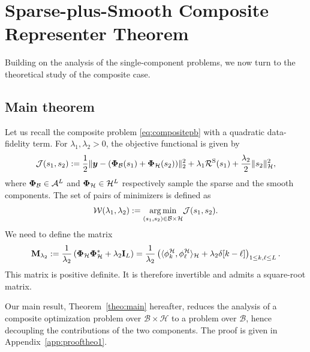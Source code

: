 \documentclass[12pt]{article}
\begin{document}

\section{Sparse-plus-Smooth Composite Representer Theorem}

    Building on the analysis of the single-component problems, we now turn to the theoretical study of the composite case.

    \subsection{Main theorem}

    Let us recall the composite problem \eqref{eq:compositepb} with a quadratic data-fidelity term. For $\lambda_1, \lambda_2 > 0$, the objective functional is given by
    \begin{equation}
        \label{eq:composite-optim}
        \mathcal{J}(s_1, s_2) := \frac{1}{2} \| \bm{y} - (\bm{\Phi}_\mathcal{B} (s_1) + \bm{\Phi}_\mathcal{H} (s_2)) \|_2^2  + \lambda_{1} \mathcal{R}^\mathrm{S}(s_1) + \frac{\lambda_{2}}{2} \| s_2 \|_{\mathcal{H}}^2,
    \end{equation}
    where $\bm{\Phi}_\mathcal{B} \in \mathcal{A}^L$ and $\bm{\Phi}_\mathcal{H}\in\mathcal{H}^L$ respectively sample the sparse and the smooth components. 
    The set of pairs of minimizers is defined as
    \begin{equation} \label{eq:argminisback}
        \mathcal{W} (\lambda_{1},\lambda_{2}) := \underset{(s_1,s_2) \in \mathcal{B} \times \mathcal{H}}{\arg\min} \mathcal{J}(s_1, s_2).
    \end{equation}
    We need to define the matrix
    \begin{equation}
        \label{eq:def-Mphi}
        \mathbf{M}_{\lambda_{2}} := \frac{1}{\lambda_{2}} \left(\bm{\Phi}_\mathcal{H}\bm{\Phi}_\mathcal{H}^* + \lambda_{2} \mathbf{I}_L\right) = \frac{1}{\lambda_{2}} \left( \langle \phi^\mathcal{H}_k , \phi^\mathcal{H}_\ell \rangle_{\mathcal{H}} + \lambda_{2} \delta[k - \ell] \right)_{1\leq k, \ell \leq L}.
    \end{equation}
    This matrix is positive definite. It is therefore invertible and admits a square-root matrix.

    Our main result, Theorem~\ref{theo:main} hereafter, reduces the analysis of a composite optimization problem over $\mathcal{B}\times\mathcal{H}$ to a problem over $\mathcal{B}$, hence decoupling the contributions of the two components. The proof is given in Appendix~\ref{app:prooftheo1}.
\end{document}
